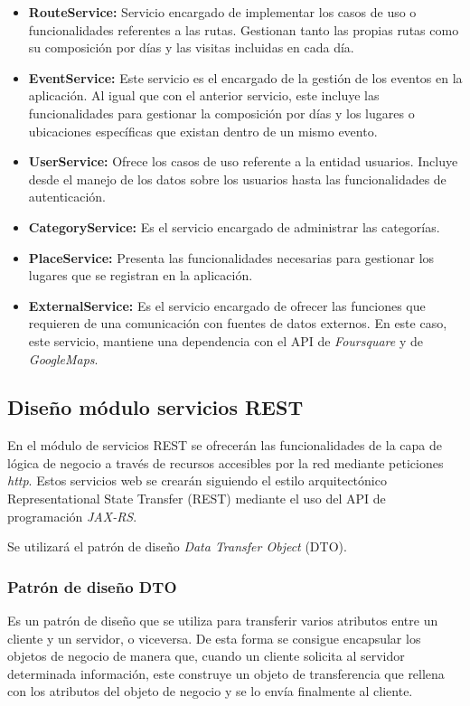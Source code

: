 \begin{itemize}
	\item \textbf{RouteService: } Servicio encargado de implementar los casos de uso o funcionalidades referentes a las rutas. Gestionan tanto las propias rutas como su composición por días y las visitas incluidas en cada día.
	\item \textbf{EventService: } Este servicio es el encargado de la gestión de los eventos en la aplicación. Al igual que con el anterior servicio, este incluye las funcionalidades para gestionar la composición por días y los lugares o ubicaciones específicas que existan dentro de un mismo evento.
	\item \textbf{UserService: } Ofrece los casos de uso referente a la entidad usuarios. Incluye desde el manejo de los datos sobre los usuarios hasta las funcionalidades de autenticación.
	\item \textbf{CategoryService: } Es el servicio encargado de administrar las categorías.
	\item \textbf{PlaceService: } Presenta las funcionalidades necesarias para gestionar los lugares que se registran en la aplicación.
	\item \textbf{ExternalService: } Es el servicio encargado de ofrecer las funciones que requieren de una comunicación con fuentes de datos externos. En este caso, este servicio, mantiene una dependencia con el API de \textit{Foursquare} y de \textit{GoogleMaps}.
\end{itemize}

\subsection{Diseño módulo servicios REST}
En el módulo de servicios REST se ofrecerán las funcionalidades de la capa de lógica de negocio a través de recursos accesibles por la red mediante peticiones \textit{http}. Estos servicios web se crearán siguiendo el estilo arquitectónico Representational State Transfer (REST) mediante el uso del API de programación \textit{JAX-RS}.

Se utilizará el patrón de diseño \textit{Data Transfer Object} (DTO).

\subsubsection*{Patrón de diseño DTO}
Es un patrón de diseño que se utiliza para transferir varios atributos entre un cliente y un servidor, o viceversa. De esta forma se consigue encapsular los objetos de negocio de manera que, cuando un cliente solicita al servidor determinada información, este construye un objeto de transferencia que rellena con los atributos del objeto de negocio y se lo envía finalmente al cliente.

